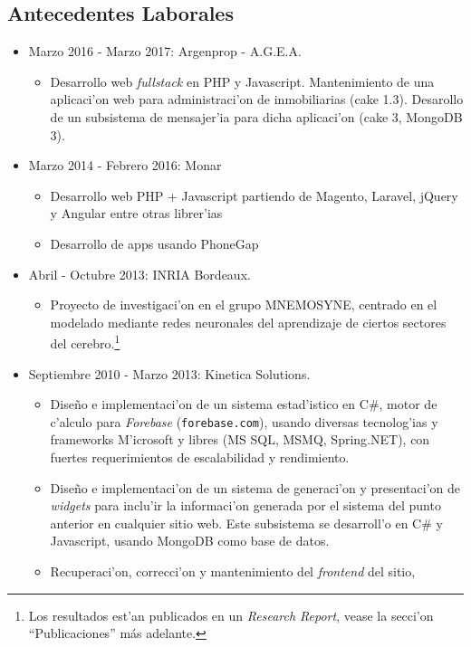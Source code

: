 \subsection*{Antecedentes Laborales}
\begin{itemize}
	\item Marzo 2016 - Marzo 2017: Argenprop - A.G.E.A.
		\begin{itemize}
			\item Desarrollo web \emph{fullstack} en PHP y Javascript.
				\subitem Mantenimiento de una aplicaci'on web para administraci'on de inmobiliarias (cake 1.3).
				\subitem Desarollo de un subsistema de mensajer'ia para dicha aplicaci'on (cake 3, MongoDB 3).
	\end{itemize}
	\item Marzo 2014 - Febrero 2016: Monar
		\begin{itemize}
			\item Desarrollo web PHP + Javascript partiendo de Magento, Laravel, jQuery y Angular
				entre otras librer'ias
			\item Desarrollo de apps usando PhoneGap
		\end{itemize}
	\item Abril - Octubre 2013: INRIA Bordeaux.
		\begin{itemize}
			\item Proyecto de investigaci'on en el grupo MNEMOSYNE, centrado en el modelado mediante
				redes neuronales del aprendizaje de ciertos sectores del cerebro.\footnote[1]{Los
					resultados est'an publicados en un \emph{Research Report}, vease la secci'on
					``Publicaciones'' más adelante.}
		\end{itemize}
	\item Septiembre 2010 - Marzo 2013: Kinetica Solutions.
		\begin{itemize}
			\item Dise\~no e implementaci'on de un sistema estad'istico en C\#,
				motor de c'alculo para \emph{Forebase} (\texttt{forebase.com}), usando
				diversas tecnolog'ias y frameworks M'icrosoft y libres (MS SQL, MSMQ,
				Spring.NET), con fuertes requerimientos de escalabilidad y rendimiento.
			\item Dise\~no e implementaci'on de un sistema de generaci'on y presentaci'on
				de \emph{widgets} para inclu'ir la informaci'on generada por el sistema del
				punto anterior en cualquier sitio web.  Este subsistema se desarroll'o en C\# y
				Javascript, usando MongoDB como base de datos.
			\item Recuperaci'on, correcci'on y mantenimiento del \emph{frontend} del sitio,

\end{itemize}
\end{itemize}
